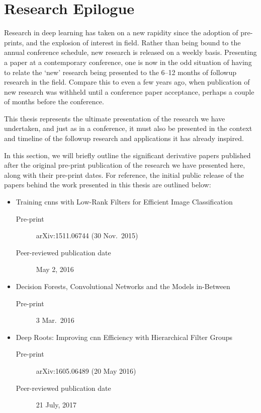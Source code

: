 \documentclass[thesis]{subfiles}
\begin{document}

\chapter{Research Epilogue}
\label{epilogue}
Research in deep learning has taken on a new rapidity since the adoption of pre-prints, and the explosion of interest in field. Rather than being bound to the annual conference schedule, new research is released on a weekly basis. Presenting a paper at a contemporary conference, one is now in the odd situation of having to relate the `new' research being presented to the 6--12 months of followup research in the field. Compare this to even a few years ago, when publication of new research was withheld until a conference paper acceptance, perhaps a couple of months before the conference.

This thesis represents the ultimate presentation of the research we have undertaken, and just as in a conference, it must also be presented in the context and timeline of the followup research and applications it has already inspired.

In this section, we will briefly outline the significant derivative papers published after the original pre-print publication of the research we have presented here, along with their pre-print dates. For reference, the initial public release of the papers behind the work presented in this thesis are outlined below:

\begin{itemize}
    \item Training \glspl{cnn} with Low-Rank Filters for Efficient Image Classification~\citep{Ioannou2016}
    \begin{description}
        \item[Pre-print] arXiv:1511.06744 (30 Nov.\ 2015)
        \item[Peer-reviewed publication date] May 2, 2016
    \end{description}
    \item Decision Forests, Convolutional Networks and the Models in-Between~\citep{Ioannou2015}
    \begin{description}
        \item[Pre-print] 3 Mar.\ 2016
    \end{description}
    \item Deep Roots: Improving \gls{cnn} Efficiency with Hierarchical Filter Groups~\citep{ioannou2016e}
    \begin{description}
        \item[Pre-print] arXiv:1605.06489 (20 May 2016)
        \item[Peer-reviewed publication date] 21 July, 2017
    \end{description}
\end{itemize}
\end{document}
